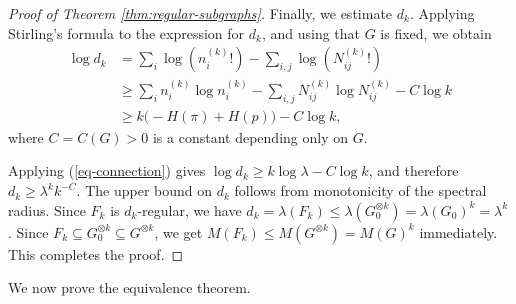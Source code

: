 \documentclass[10pt,a4paper]{amsart}
\begin{document}
\begin{proof}[Proof of Theorem \ref{thm:regular-subgraphs}]
Finally, we estimate \(d_k\).   Applying Stirling's
formula to the expression for \(d_k\), and using that \(G\) is fixed, we
obtain
\[
\begin{aligned}
        \log d_k
        &=
        \sum_i \log(n_i^{(k)}!)
        -
        \sum_{i,j}\log(N_{ij}^{(k)}!)                                      \\
        &\ge
        \sum_i n_i^{(k)}\log n_i^{(k)}
        -
        \sum_{i,j}N_{ij}^{(k)}\log N_{ij}^{(k)}
        -
        C\log k                                                            \\
        &\ge
        k\bigl(-H(\pi) + H(p) \bigr)-C\log k,
\end{aligned}
\]
where \(C=C(G)>0\) is a constant depending only on $G$.

Applying (\ref{eq-connection}) gives $\log d_k\ge k\log\lambda-C\log k$,
and therefore  $d_k\ge \lambda^k k^{-C}. $
The upper bound on \(d_k\) follows from monotonicity of the spectral
radius.  Since \(F_k\) is \(d_k\)-regular, we have $d_k=\lambda(F_k)\le \lambda(G_0^{\otimes k})=\lambda(G_0)^k=\lambda^k$.
Since \(F_k\subseteq G_0^{\otimes k}\subseteq G^{\otimes k}\), we get $M(F_k)\le M(G^{\otimes k})=M(G)^k$ immediately.
This completes the proof.
\end{proof}

We now prove the equivalence theorem.
\end{document}
